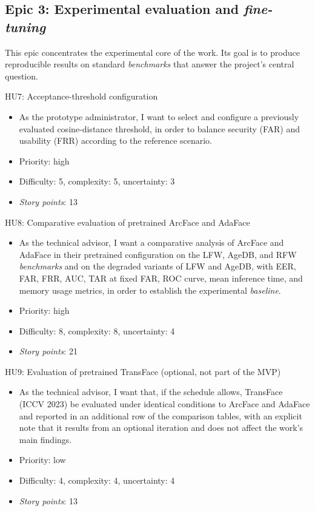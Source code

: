 \documentclass[
  11pt, %
]{charter}
\begin{document}
\subsection{Epic 3: Experimental evaluation and \textit{fine-tuning}}

This epic concentrates the experimental core of the work. Its goal is to produce reproducible results on standard \textit{benchmarks} that answer the project's central question.

HU7: Acceptance-threshold configuration
\begin{itemize}
  \item As the prototype administrator, I want to select and configure a previously evaluated cosine-distance threshold, in order to balance security (FAR) and usability (FRR) according to the reference scenario.
  \item Priority: high
  \item Difficulty: 5, complexity: 5, uncertainty: 3
  \item \textit{Story points}: 13
\end{itemize}

HU8: Comparative evaluation of pretrained ArcFace and AdaFace
\begin{itemize}
  \item As the technical advisor, I want a comparative analysis of ArcFace and AdaFace in their pretrained configuration on the LFW, AgeDB, and RFW \textit{benchmarks} and on the degraded variants of LFW and AgeDB, with EER, FAR, FRR, AUC, TAR at fixed FAR, ROC curve, mean inference time, and memory usage metrics, in order to establish the experimental \textit{baseline}.
  \item Priority: high
  \item Difficulty: 8, complexity: 8, uncertainty: 4
  \item \textit{Story points}: 21
\end{itemize}

HU9: Evaluation of pretrained TransFace (optional, not part of the MVP)
\begin{itemize}
  \item As the technical advisor, I want that, if the schedule allows, TransFace (ICCV 2023) be evaluated under identical conditions to ArcFace and AdaFace and reported in an additional row of the comparison tables, with an explicit note that it results from an optional iteration and does not affect the work's main findings.
  \item Priority: low
  \item Difficulty: 4, complexity: 4, uncertainty: 4
  \item \textit{Story points}: 13
\end{itemize}
\end{document}
